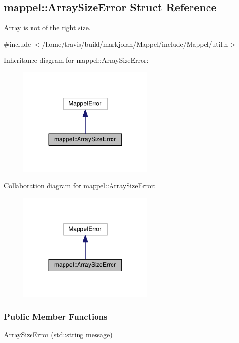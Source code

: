 \hypertarget{structmappel_1_1ArraySizeError}{}\subsection{mappel\+:\+:Array\+Size\+Error Struct Reference}
\label{structmappel_1_1ArraySizeError}


Array is not of the right size.  




{\ttfamily \#include $<$/home/travis/build/markjolah/\+Mappel/include/\+Mappel/util.\+h$>$}



Inheritance diagram for mappel\+:\+:Array\+Size\+Error\+:\nopagebreak
\begin{figure}[H]
\begin{center}
\leavevmode
\includegraphics[width=192pt]{structmappel_1_1ArraySizeError__inherit__graph}
\end{center}
\end{figure}


Collaboration diagram for mappel\+:\+:Array\+Size\+Error\+:\nopagebreak
\begin{figure}[H]
\begin{center}
\leavevmode
\includegraphics[width=192pt]{structmappel_1_1ArraySizeError__coll__graph}
\end{center}
\end{figure}
\subsubsection*{Public Member Functions}
\begin{DoxyCompactItemize}
\item 
\hyperlink{structmappel_1_1ArraySizeError_a568adee7749d5976dfd63f71a3028a00}{Array\+Size\+Error} (std\+::string message)
\end{DoxyCompactItemize}


